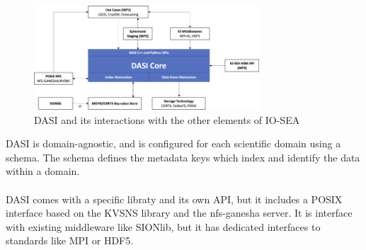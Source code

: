 \begin{figure}[H]
    \centering
    \includegraphics[width=0.75\textwidth]{FIGS/dasi.png}
    \caption[Migration Path]{ DASI and its interactions with the other elements of IO-SEA}
    \label{fig:dasi}
\end{figure}

DASI is domain-agnostic, and is configured for each scientific domain using a schema. The schema
defines the metadata keys which index and identify the data within a domain. 

\paragraph{}
DASI comes with a specific libraty and its own API, but it includes a POSIX interface based on the KVSNS
library and the nfs-ganesha server. It is interface with existing middleware like SIONlib, but it has 
dedicated interfaces to standards like MPI or HDF5. 

